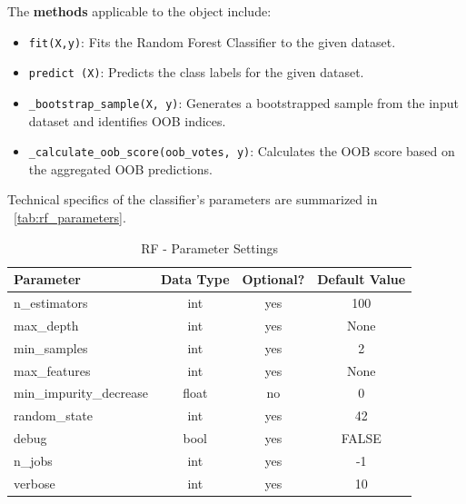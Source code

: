 \begin{appendices}
  The \textbf{methods} applicable to the object include:
  \begin{itemize}
    \item \texttt{fit(X,y)}: Fits the Random Forest Classifier to the given dataset.
    \item \texttt{predict (X)}: Predicts the class labels for the given dataset.
    \item \texttt{\_bootstrap\_sample(X, y)}: Generates a bootstrapped sample from the input dataset and identifies OOB indices.
    \item \texttt{\_calculate\_oob\_score(oob\_votes, y)}: Calculates the OOB score based on the aggregated OOB predictions.
  \end{itemize}

  Technical specifics of the classifier's parameters are summarized in ~\autoref{tab:rf_parameters}.

  \begin{table}[H]
    \centering
    \begin{tabular}{lccc}
      \toprule
      \textbf{Parameter}      & \textbf{Data Type} & \textbf{Optional?} & \textbf{Default Value} \\
      \midrule
      n\_estimators           & int                & yes                & 100                    \\
      max\_depth              & int                & yes                & None                   \\
      min\_samples            & int                & yes                & 2                      \\
      max\_features           & int                & yes                & None                   \\
      min\_impurity\_decrease & float              & no                 & 0                      \\
      random\_state           & int                & yes                & 42                     \\
      debug                   & bool               & yes                & FALSE                  \\
      n\_jobs                 & int                & yes                & -1                     \\
      verbose                 & int                & yes                & 10                     \\
      \bottomrule
    \end{tabular}
    \caption{RF - Parameter Settings}
    \label{tab:rf_parameters}
  \end{table}


\end{appendices}
